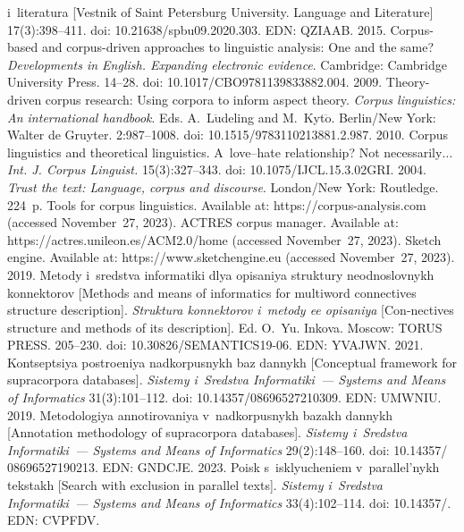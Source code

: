 \begin{multicols}{2}
{{\begin{thebibliography}{99}
{i~literatura} [Vestnik of Saint Petersburg University. Language and Literature] 17(3):398--411. 
doi: 10.21638/spbu09.2020.303. EDN: QZIAAB.
 2015. Corpus-based and corpus-driven approaches to linguistic analysis: 
One and the same? \textit{Developments in English. Expanding electronic evidence}. 
Cambridge: Cambridge University Press. 14--28. doi: 10.1017/CBO9781139833882.004.
 2009. Theory-driven corpus research: Using corpora to inform aspect theory. 
\textit{Corpus linguistics: An international handbook}.  Eds. 
A.~L$\ddot{\mbox{u}}$deling and M.~Kyt$\ddot{\mbox{o}}$. Berlin/New York: Walter de 
Gruyter. 2:987--1008. doi: 10.1515/9783110213881.2.987.
 2010. Corpus linguistics and theoretical linguistics. A~love--hate 
relationship? Not necessarily$\ldots$ \textit{Int. J. Corpus Linguist.} 15(3):327--343. doi: 
10.1075/\linebreak IJCL.15.3.02GRI.
 2004. \textit{Trust the text: Language, corpus and discourse}. London/New 
York: Routledge. 224~p.
Tools for corpus linguistics. Available at: {\sf https://corpus-analysis.com} (accessed 
November~27, 2023).
ACTRES corpus manager. Available at: {\sf https://actres.\linebreak unileon.es/ACM2.0/home} (accessed 
November~27, 2023).
Sketch engine. Available at: {\sf https://www.sketchengine.\linebreak eu} (accessed November~27, 2023).
 2019. Metody i~sredstva informatiki 
dlya opisaniya struktury neodnoslovnykh konnektorov [Methods and means of informatics for 
multiword connectives structure description]. \textit{Struktura konnektorov i~metody ee 
opisaniya} [Con-nectives structure and methods of its description]. Ed. O.~Yu. Inkova. Moscow: 
TORUS PRESS. 205--230. doi: 10.30826/SEMANTICS19-06. EDN: YVAJWN.
 2021. Kontseptsiya postroeniya nadkorpusnykh baz dannykh [Conceptual 
framework for supracorpora databases]. \textit{Sistemy i~Sredstva Informatiki~--- Systems and 
Means of Informatics} 31(3):101--112. doi: 10.14357/08696527210309. EDN: UMWNIU.
 2019. Metodologiya 
annotirovaniya v~nadkorpusnykh ba\-zakh dan\-nykh [Annotation methodology of supracorpora 
databases]. \textit{Sistemy i~Sredstva Informatiki~--- Systems and Means of Informatics} 
29(2):148--160. doi: 10.14357/ 08696527190213. EDN: GNDCJE.
 2023. Poisk s~isklyucheniem v~parallel'nykh teks\-takh [Search with 
exclusion in parallel texts]. \textit{Sistemy i~Sredstva Informatiki~--- Systems and Means of 
Informatics} 33(4):102--114. doi: 10.14357\!/.  EDN: CVPFDV.

\end{thebibliography}

 }
 }

\end{multicols}

